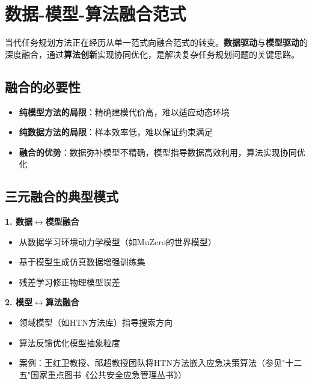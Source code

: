 \section{数据-模型-算法融合范式}

当代任务规划方法正在经历从单一范式向融合范式的转变。\textbf{数据驱动}与\textbf{模型驱动}的深度融合，通过\textbf{算法创新}实现协同优化，是解决复杂任务规划问题的关键思路。

\subsection{融合的必要性}

\begin{keypoint}[为什么需要融合？]
\begin{itemize}
  \item \textbf{纯模型方法的局限}：精确建模代价高，难以适应动态环境
  \item \textbf{纯数据方法的局限}：样本效率低，难以保证约束满足
  \item \textbf{融合的优势}：数据弥补模型不精确，模型指导数据高效利用，算法实现协同优化
\end{itemize}
\end{keypoint}

\subsection{三元融合的典型模式}

\textbf{1. 数据$\leftrightarrow$模型融合}
\begin{itemize}[leftmargin=2em]
  \item 从数据学习环境动力学模型（如MuZero的世界模型）
  \item 基于模型生成仿真数据增强训练集
  \item 残差学习修正物理模型误差
\end{itemize}

\textbf{2. 模型$\leftrightarrow$算法融合}
\begin{itemize}[leftmargin=2em]
  \item 领域模型（如HTN方法库）指导搜索方向
  \item 算法反馈优化模型抽象粒度
  \item 案例：王红卫教授、祁超教授团队将HTN方法嵌入应急决策算法（参见"十二五"国家重点图书《公共安全应急管理丛书》）
\end{itemize}


